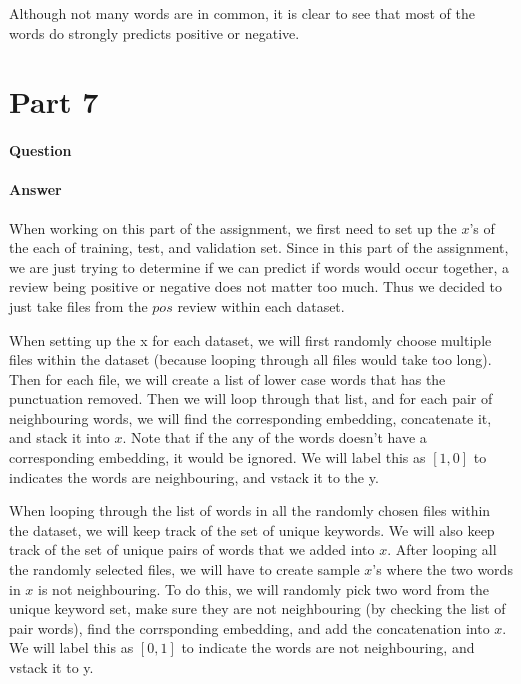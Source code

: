 \documentclass[11pt,twoside]{article}
\begin{document}
Although not many words are in common, it is clear to see that most of the words do strongly predicts positive or negative.
\clearpage

\section*{Part 7}
\paragraph{Question}


\paragraph{Answer}
When working on this part of the assignment, we first need to set up the $x$'s of the each of training, test, and validation set. Since in this part of the assignment, we are just trying to determine if we can predict if words would occur together, a review being positive or negative does not matter too much. Thus we decided to just take files from the $pos$ review within each dataset.

When setting up the x for each dataset, we will first randomly choose multiple files within the dataset (because looping through all files would take too long). Then for each file, we will create a list of lower case words that has the punctuation removed. Then we will loop through that list, and for each pair of neighbouring words, we will find the corresponding embedding, concatenate it, and stack it into $x$. Note that if the any of the words doesn't have a corresponding embedding, it would be ignored. We will label this as $[1, 0]$ to indicates the words are neighbouring, and vstack it to the y.

When looping through the list of words in all the randomly chosen files within the dataset, we will keep track of the set of unique keywords. We will also keep track of the set of unique pairs of words that we added into $x$. After looping all the randomly selected files, we will have to create sample $x$'s where the two words in $x$ is not neighbouring. To do this, we will randomly pick two word from the unique keyword set, make sure they are not neighbouring (by checking the list of pair words), find the corrsponding embedding, and add the concatenation into $x$. We will label this as $[0, 1]$ to indicate the words are not neighbouring, and vstack it to y.
\end{document}
